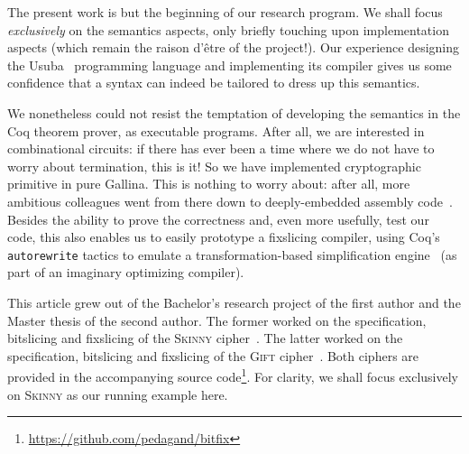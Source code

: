 \documentclass[draft,english]{jflart}
\newcommand{\Skinny}{\textsc{Skinny}}
\newcommand{\Gift}{\textsc{Gift}}
\begin{document}

The present work is but the beginning of our research program. We
shall focus \emph{exclusively} on the semantics aspects, only briefly
touching upon implementation aspects (which remain the raison d'être
of the project!). Our experience designing the Usuba~\citep{mercadier:PhD}
programming language and implementing its compiler gives us some
confidence that a syntax can indeed be tailored to dress up this
semantics.

We nonetheless could not resist the temptation of developing the
semantics in the Coq theorem prover, as executable programs. After
all, we are interested in combinational circuits: if there has ever
been a time where we do not have to worry about termination, this is
it! So we have implemented cryptographic primitive in pure Gallina.
This is nothing to worry about: after all, more ambitious colleagues
went from there down to deeply-embedded assembly
code~\citep{chlipala:coq-crypto}. Besides the ability to prove the
correctness and, even more usefully, test our code, this also enables
us to easily prototype a fixslicing compiler, using Coq's
\texttt{autorewrite} tactics to emulate a transformation-based
simplification engine~\citep{peyton-jones:haskell-optim} (as part of
an imaginary optimizing compiler).




This article grew out of the Bachelor's research project of the first
author and the Master thesis of the second author. The former worked
on the specification, bitslicing and fixslicing of the \Skinny{}
cipher~\citep{beierle:skinny, adomnicai:fixslicing-AES-like}. The
latter worked on the specification, bitslicing and fixslicing of the
\Gift{} cipher~\citep{subhadeep:gift, adominicai:fixslicing-gift}. Both
ciphers are provided in the accompanying source
code\footnote{\url{https://github.com/pedagand/bitfix}}. For clarity,
we shall focus exclusively on \Skinny{} as our running example here.
\end{document}
